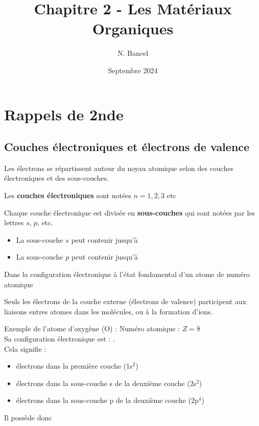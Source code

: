 \documentclass{article}
\title{Chapitre 2 - Les Matériaux Organiques}
\author{N. Bancel}
\date{Septembre 2024}
\begin{document}
\maketitle

\section{Rappels de 2nde}
\subsection{Couches électroniques et électrons de valence}
\begin{tcolorbox}[colback=green!10!white, colframe=green!75!black, title=Définitions : ]
  Les électrons se répartissent autour du noyau atomique selon des couches électroniques et des sous-couches. \par 
  \vspace{1em}
  Les \textbf{couches électroniques} sont notées \(n = 1, 2, 3\) etc \par 
  Chaque couche électronique est divisée en \textbf{sous-couches} qui sont notées par les lettres \(s\), \(p\), etc.
  \begin{itemize}[noitemsep]
    \item La sous-couche \(s\) peut contenir jusqu'à 
    \item La sous-couche \(p\) peut contenir jusqu'à 
  \end{itemize}

  Dans la configuration électronique à l'état fondamental d'un atome de numéro atomique 
  
  Seuls les électrons de la couche externe (électrons de valence) participent aux liaisons entres atomes dans les molécules, ou à la formation d’ions. 
  
\end{tcolorbox}

\begin{tcolorbox}[colback=blue!10!white, colframe=blue!75!black, title=Application : Structure électronique]
  Exemple de l'atome d'oxygène (O) : Numéro atomique : \(Z = 8\) \\
  Sa configuration électronique est : . \\
  Cela signifie :
  \begin{itemize}[noitemsep]
    \item {} électrons dans la première couche (1s$^2$)
    \item {} électrons dans la sous-couche s de la deuxième couche (2s$^2$)
    \item {} électrons dans la sous-couche p de la deuxième couche (2p$^4$)
  \end{itemize}
  Il possède donc 
\end{tcolorbox}
\end{document}
